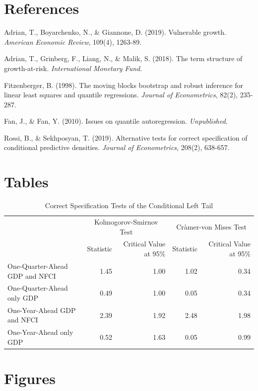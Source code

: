 \documentclass[
  11pt,
]{article}
\begin{document}
\hypertarget{references}{%
\section{References}\label{references}}

Adrian, T., Boyarchenko, N., \& Giannone, D. (2019). Vulnerable growth.
\emph{American Economic Review}, 109(4), 1263-89.

Adrian, T., Grinberg, F., Liang, N., \& Malik, S. (2018). The term
structure of growth-at-risk. \emph{International Monetary Fund}.

Fitzenberger, B. (1998). The moving blocks bootstrap and robust
inference for linear least squares and quantile regressions.
\emph{Journal of Econometrics}, 82(2), 235-287.

Fan, J., \& Fan, Y. (2010). Issues on quantile autoregression.
\emph{Unpublished}.

Rossi, B., \& Sekhposyan, T. (2019). Alternative tests for correct
specification of conditional predictive densities. \emph{Journal of
Econometrics}, 208(2), 638-657.

\newpage

\hypertarget{tables}{%
\section{Tables}\label{tables}}

\begin{longtable}[t]{lrrrr}
\caption{\label{tab:table1}Correct Specification Tests of the Conditional Left Tail}\\
\toprule
\multicolumn{1}{c}{ } & \multicolumn{2}{c}{Kolmogorov-Smirnov Test} & \multicolumn{2}{c}{Cràmer-von Mises Test} \\
\cmidrule(l{3pt}r{3pt}){2-3} \cmidrule(l{3pt}r{3pt}){4-5}
  & Statistic & Critical Value at 95\% & Statistic & Critical Value at 95\%\\
\midrule
One-Quarter-Ahead GDP and NFCI & 1.45 & 1.00 & 1.02 & 0.34\\
One-Quarter-Ahead only GDP & 0.49 & 1.00 & 0.05 & 0.34\\
One-Year-Ahead GDP and NFCI & 2.39 & 1.92 & 2.48 & 1.98\\
One-Year-Ahead only GDP & 0.52 & 1.63 & 0.05 & 0.99\\
\bottomrule
\end{longtable}

\newpage

\hypertarget{figures}{%
\section{Figures}\label{figures}}
\end{document}
